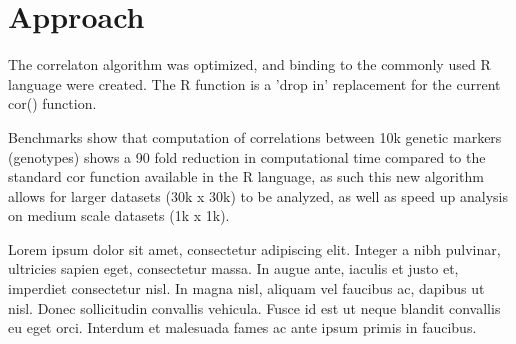 \documentclass{bioinfo}
\begin{document}
\section{Approach}
The correlaton algorithm was optimized, and binding to the commonly 
used R language were created. The R function is a 'drop in' replacement 
for the current cor() function.\par
Benchmarks show that computation of correlations between 10k genetic 
markers (genotypes) shows a 90 fold reduction in computational time 
compared to the standard cor function available in the R language, as 
such this new algorithm allows for larger datasets (30k x 30k) to be 
analyzed, as well as speed up analysis on medium scale datasets 
(1k x 1k).\par
Lorem ipsum dolor sit amet, consectetur adipiscing elit. Integer a 
nibh pulvinar, ultricies sapien eget, consectetur massa. In augue 
ante, iaculis et justo et, imperdiet consectetur nisl. In magna 
nisl, aliquam vel faucibus ac, dapibus ut nisl. Donec sollicitudin 
convallis vehicula. Fusce id est ut neque blandit convallis eu eget 
orci. Interdum et malesuada fames ac ante ipsum primis in faucibus. 
\end{document}
